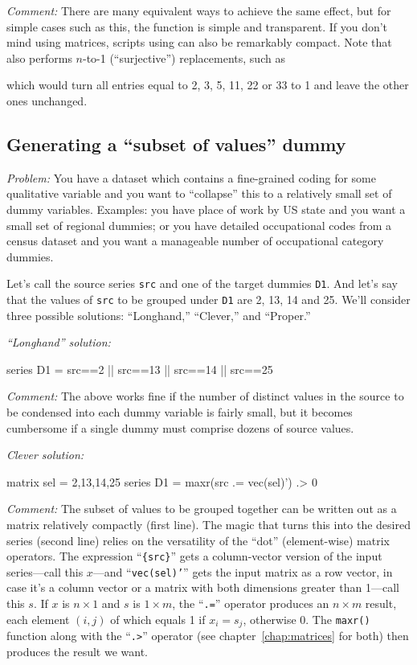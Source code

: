 \emph{Comment:} There are many equivalent ways to achieve the same
effect, but for simple cases such as this, the  function
is simple and transparent. If you don't mind using matrices, scripts
using  can also be remarkably compact. Note that
 also performs $n$-to-1 (``surjective'') replacements,
such as
\begin{code}
series x = replace{z, {2, 3, 5, 11, 22, 33}, 1)
\end{code}
which would turn all entries equal to 2, 3, 5, 11, 22 or 33 to 1 and
leave the other ones unchanged.

\subsection{Generating a ``subset of values'' dummy}

\emph{Problem:} You have a dataset which contains a fine-grained
coding for some qualitative variable and you want to ``collapse'' this
to a relatively small set of dummy variables. Examples: you have place
of work by US state and you want a small set of regional dummies; or
you have detailed occupational codes from a census dataset and you
want a manageable number of occupational category dummies.

Let's call the source series \texttt{src} and one of the target dummies
\texttt{D1}. And let's say that the values of \texttt{src} to be grouped
under \texttt{D1} are 2, 13, 14 and 25. We'll consider three possible
solutions: ``Longhand,'' ``Clever,'' and ``Proper.''

\emph{``Longhand'' solution:}
\begin{code}
series D1 = src==2 || src==13 || src==14 || src==25
\end{code}

\emph{Comment:} The above works fine if the number of distinct values
in the source to be condensed into each dummy variable is fairly
small, but it becomes cumbersome if a single dummy must comprise
dozens of source values.

\emph{Clever solution:}
\begin{code}
matrix sel = {2,13,14,25}
series D1 = maxr({src} .= vec(sel)') .> 0
\end{code}

\emph{Comment:} The subset of values to be grouped together can be
written out as a matrix relatively compactly (first line). The magic
that turns this into the desired series (second line) relies on the
versatility of the ``dot'' (element-wise) matrix operators. The
expression ``\texttt{\{src\}}'' gets a column-vector version of the
input series---call this $x$---and ``\texttt{vec(sel)'}'' gets the
input matrix as a row vector, in case it's a column vector or a matrix
with both dimensions greater than 1---call this $s$. If $x$ is
$n\times1$ and $s$ is $1\times m$, the ``\texttt{.=}'' operator
produces an $n\times m$ result, each element $(i,j)$ of which equals 1
if $x_i = s_j$, otherwise 0. The \texttt{maxr()} function along with
the ``\verb|.>|'' operator (see chapter~\ref{chap:matrices} for both)
then produces the result we want.

